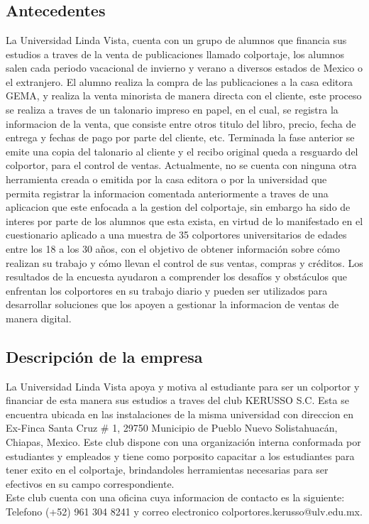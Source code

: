 \documentclass[runningheads]{llncs}
\begin{document}
    \section{}

        \subsection{Antecedentes}
            La Universidad Linda Vista, cuenta con un grupo de alumnos que financia sus estudios a traves de la venta de publicaciones llamado colportaje, los alumnos salen cada periodo vacacional de invierno y verano a diversos estados de Mexico o el extranjero. El alumno realiza la compra de las publicaciones a la casa editora GEMA, y realiza la venta minorista de manera directa con el cliente, este proceso se realiza a traves de un talonario impreso en papel, en el cual, se registra la informacion de la venta, que consiste entre otros titulo del libro, precio, fecha de entrega y fechas de pago por parte del cliente, etc. Terminada la fase anterior se emite una copia del talonario al cliente y el recibo original queda a resguardo del colportor, para el control de ventas.
            Actualmente, no se cuenta con ninguna otra herramienta creada o emitida por la casa editora o por la universidad que permita registrar la informacion comentada anteriormente a traves de una aplicacion que este enfocada a la gestion del colportaje, sin embargo ha sido de interes por parte de los alumnos que esta exista, en virtud de lo manifestado en el cuestionario aplicado a una muestra de 35 colportores universitarios de edades entre los 18 a los 30 años, con el objetivo de obtener información sobre cómo realizan su trabajo y cómo llevan el control de sus ventas, compras y créditos. Los resultados de la encuesta ayudaron a comprender los desafíos y obstáculos que enfrentan los colportores en su trabajo diario y pueden ser utilizados para desarrollar soluciones que los apoyen a gestionar la informacion de ventas de manera digital.

        \subsection{Descripción de la empresa}
            La Universidad Linda Vista apoya y motiva al estudiante para ser un colportor y financiar de esta manera sus estudios a traves del club KERUSSO S.C. Esta se encuentra ubicada en las instalaciones de la misma universidad con direccion en Ex-Finca Santa Cruz \# 1, 29750 Municipio de Pueblo Nuevo Solistahuacán, Chiapas, Mexico. Este club dispone con una organización interna conformada por estudiantes y empleados y tiene como porposito capacitar a los estudiantes para tener exito en el colportaje, brindandoles herramientas necesarias para ser efectivos en su campo correspondiente.\\
            Este club cuenta con una oficina cuya informacion de contacto es la siguiente: Telefono (+52) 961 304 8241 y correo electronico colportores.kerusso@ulv.edu.mx.
\end{document}
